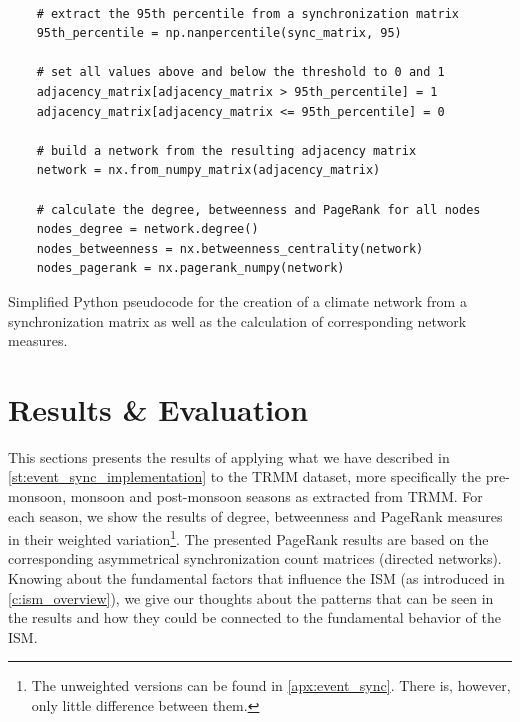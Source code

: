 \begin{listing}[h]
  \begin{verbatim}

    # extract the 95th percentile from a synchronization matrix
    95th_percentile = np.nanpercentile(sync_matrix, 95)

    # set all values above and below the threshold to 0 and 1
    adjacency_matrix[adjacency_matrix > 95th_percentile] = 1
    adjacency_matrix[adjacency_matrix <= 95th_percentile] = 0

    # build a network from the resulting adjacency matrix
    network = nx.from_numpy_matrix(adjacency_matrix)

    # calculate the degree, betweenness and PageRank for all nodes
    nodes_degree = network.degree()
    nodes_betweenness = nx.betweenness_centrality(network)
    nodes_pagerank = nx.pagerank_numpy(network)

  \end{verbatim}
  \caption{Simplified Python pseudocode for the creation of a climate network from a synchronization matrix as well as the calculation of corresponding network measures.}
  \label{lst:climate_networks}
\end{listing}

\clearpage
\section{Results \& Evaluation}
\label{st:event_sync_results}
This sections presents the results of applying what we have described in \cref{st:event_sync_implementation} to the TRMM dataset, more specifically the pre-monsoon, monsoon and post-monsoon seasons as extracted from TRMM. For each season, we show the results of degree, betweenness and PageRank measures in their weighted variation\footnote{The unweighted versions can be found in \cref{apx:event_sync}. There is, however, only little difference between them.}. The presented PageRank results are based on the corresponding asymmetrical synchronization count matrices (directed networks). Knowing about the fundamental factors that influence the ISM (as introduced in \cref{c:ism_overview}), we give our thoughts about the patterns that can be seen in the results and how they could be connected to the fundamental behavior of the ISM.

